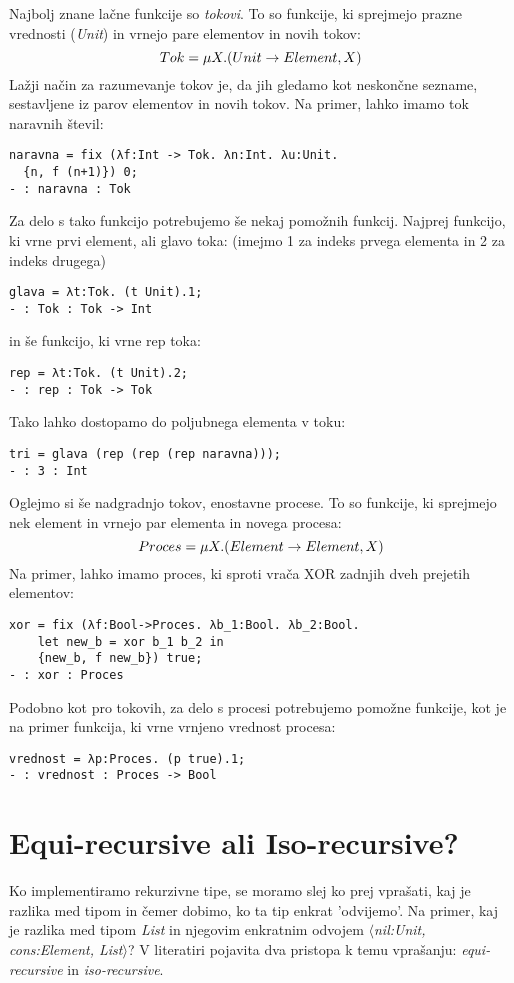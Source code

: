 \documentclass[12pt,a4paper,openany]{book}
\begin{document}
Najbolj znane lačne funkcije so \emph{tokovi}. To so funkcije, ki sprejmejo prazne vrednosti (\emph{Unit}) in vrnejo pare elementov in novih tokov:
\begin{equation}
    Tok = \mu X. (Unit \rightarrow {Element, X}) \notag
\end{equation}
Lažji način za razumevanje tokov je, da jih gledamo kot neskončne sezname, sestavljene iz parov elementov in novih tokov. Na primer, lahko imamo tok naravnih števil:
\begin{lstlisting}
naravna = fix (λf:Int -> Tok. λn:Int. λu:Unit. 
  {n, f (n+1)}) 0;
- : naravna : Tok
\end{lstlisting}
Za delo s tako funkcijo potrebujemo še nekaj pomožnih funkcij. Najprej funkcijo, ki vrne prvi element, ali glavo toka: (imejmo 1 za indeks prvega elementa in 2 za indeks drugega)
\begin{lstlisting}
glava = λt:Tok. (t Unit).1;
- : Tok : Tok -> Int
\end{lstlisting}
in še funkcijo, ki vrne rep toka:
\begin{lstlisting}
rep = λt:Tok. (t Unit).2;
- : rep : Tok -> Tok
\end{lstlisting}
Tako lahko dostopamo do poljubnega elementa v toku:
\begin{lstlisting}
tri = glava (rep (rep (rep naravna)));
- : 3 : Int
\end{lstlisting}

Oglejmo si še nadgradnjo tokov, enostavne procese. To so funkcije, ki sprejmejo nek element in vrnejo par elementa in novega procesa:
\begin{equation}
    Proces = \mu X. (Element \rightarrow {Element, X}) \notag
\end{equation}
Na primer, lahko imamo proces, ki sproti vrača XOR zadnjih dveh prejetih elementov:
\begin{lstlisting}
xor = fix (λf:Bool->Proces. λb_1:Bool. λb_2:Bool. 
    let new_b = xor b_1 b_2 in
    {new_b, f new_b}) true;
- : xor : Proces
\end{lstlisting}
Podobno kot pro tokovih, za delo s procesi potrebujemo pomožne funkcije, kot je na primer funkcija, ki vrne vrnjeno vrednost procesa:
\begin{lstlisting}
vrednost = λp:Proces. (p true).1;
- : vrednost : Proces -> Bool
\end{lstlisting}


\section{Equi-recursive ali Iso-recursive?}
Ko implementiramo rekurzivne tipe, se moramo slej ko prej vprašati, kaj je razlika med tipom in čemer dobimo, ko ta tip enkrat 'odvijemo'. Na primer, kaj je razlika med tipom \emph{List}
in njegovim enkratnim odvojem \emph{$\langle$nil:Unit, cons:{Element, List}$\rangle$}? V literatiri pojavita dva pristopa k temu vprašanju: \emph{equi-recursive} in \emph{iso-recursive}.
\end{document}
